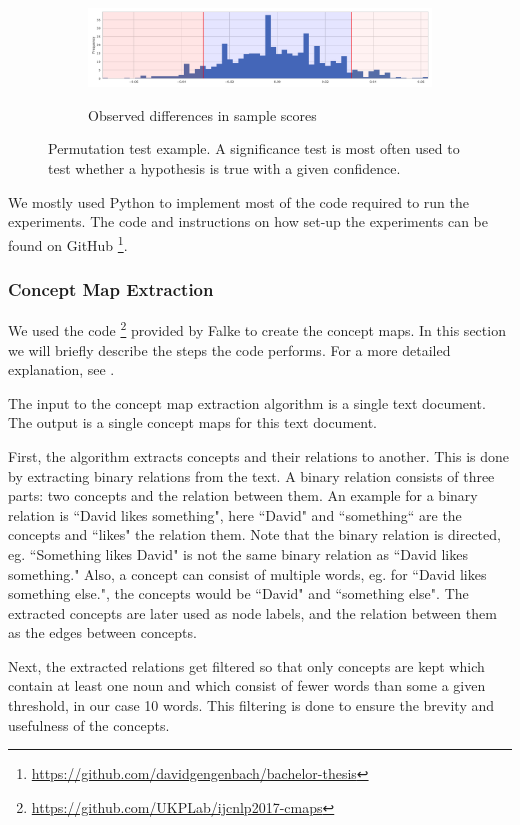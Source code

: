 \begin{figure}[htb!]
  \begin{subfigure}[t]{\linewidth}
  {\includegraphics[width=1\textwidth]{assets/figures/permutation_test/distribution.pdf}\label{fig:permutation_test_distribution}}
  \caption{Observed differences in sample scores}
  \end{subfigure}
  \caption{Permutation test example. A significance test is most often used to test whether a hypothesis is true with a given confidence.}
  \label{fig:example_permutation_test}
\end{figure}


We mostly used Python to implement most of the code required to run the experiments.
The code and instructions on how set-up the experiments can be found on GitHub \footnote{\url{https://github.com/davidgengenbach/bachelor-thesis}}.

\subsubsection{Concept Map Extraction}
We used the code \footnote{\url{https://github.com/UKPLab/ijcnlp2017-cmaps}} provided by Falke \cite{Falke2017} to create the concept maps.
In this section we will briefly describe the steps the code performs. For a more detailed explanation, see \cite{Falke2017}.

The input to the concept map extraction algorithm is a single text document. The output is a single concept maps for this text document.

First, the algorithm extracts concepts and their relations to another.
This is done by extracting binary relations from the text. A binary relation consists of three parts: two concepts and the relation between them. An example for a binary relation is ``David likes something", here ``David" and ``something`` are the concepts and ``likes" the relation them. Note that the binary relation is directed, eg. ``Something likes David" is not the same binary relation as ``David likes something."
Also, a concept can consist of multiple words, eg. for ``David likes something else.", the concepts would be ``David" and ``something else".
The extracted concepts are later used as node labels, and the relation between them as the edges between concepts.

Next, the extracted relations get filtered so that only concepts are kept which contain at least one noun and which consist of fewer words than some a given threshold, in our case 10 words. This filtering is done to ensure the brevity and usefulness of the concepts.
